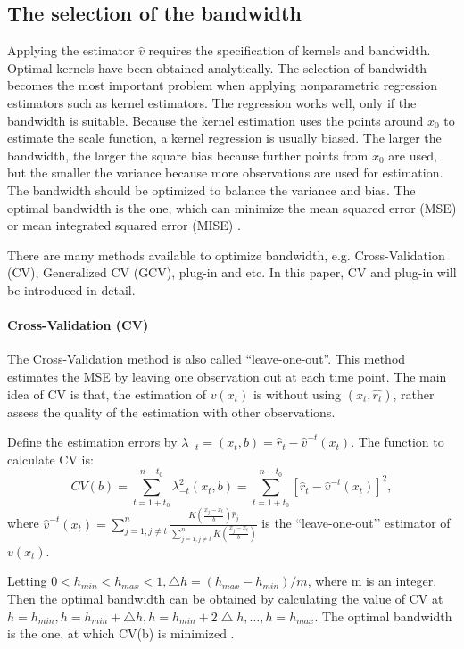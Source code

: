 \subsection{The selection of the bandwidth}
Applying the estimator $\hat{v}$ requires the specification of kernels and bandwidth. Optimal kernels have been obtained analytically. The selection of bandwidth becomes the most important problem when applying nonparametric regression estimators such as kernel estimators. The regression works well, only if the bandwidth is suitable. Because the kernel estimation uses the points around $x_{0}$ to estimate the scale function, a kernel regression is usually biased. The larger the bandwidth, the larger the square bias because further points from $x_{0}$ are used, but the smaller the variance because more observations are used for estimation. The bandwidth should be optimized to balance the variance and bias. The optimal bandwidth is the one, which can minimize the mean squared error (MSE) or mean integrated squared error (MISE) \citep{Gasser1991}. 

There are many methods available to optimize bandwidth, e.g. Cross-Validation (CV), Generalized CV (GCV), plug-in and etc. In this paper, CV and plug-in will be introduced in detail.

\paragraph{Cross-Validation (CV)}

The Cross-Validation method is also called “leave-one-out”. This method estimates the MSE by leaving one observation out at each time point. The main idea of CV is that, the estimation of $v(x_{t})$ is without using $(x_{t},\hat{r_{t}})$, rather assess the quality of the estimation with other observations. 

Define the estimation errors by $\lambda_{-t}=(x_{t},b)=\hat{r}_{t}-\hat{v}^{-t}(x_{t})$. The function to calculate CV is:
\begin{equation}
CV(b) = \sum_{t=1+t_{0}}^{n-t_{0}}\lambda_{-t}^{2}(x_{t},b)=\sum_{t=1+t_{0}}^{n-t_{0}}[\hat{r}_{t}-\hat{v}^{-t}(x_{t})]^{2},
\end{equation}
where $\hat{v}^{-t}(x_t)=\sum_{j=1,j\neq t}^{n}\frac{K(\frac{x_{j}-x_{t}}{b})\hat{r}_{j}}{\sum_{j=1,j \neq t}^{n}K(\frac{x_{j}-x_{t}}{b})}$ is the “leave-one-out’’ estimator of $v(x_{t})$.

Letting $0<h_{min}<h_{max}<1, \bigtriangleup h=(h_{max}-h_{min})/m$, where m is an integer. Then the optimal bandwidth can be obtained by calculating the value of CV at $h=h_{min}, h=h_{min} + \bigtriangleup h, h=h_{min} + 2\bigtriangleup h, \ldots, h=h_{max}$. The optimal bandwidth is the one, at which CV(b) is minimized \citep{Sarda1993}.

